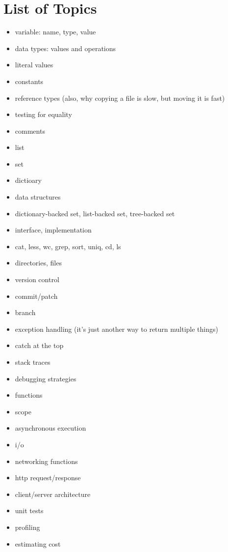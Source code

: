\section{List of Topics}
\begin{itemize}
  \item variable: name, type, value
  \item data types: values and operations
  \item literal values
  \item constants
\item reference types (also, why copying a file is slow, but moving it is fast)  \item testing for equality
  \item comments

  \item list
  \item set
  \item dictioary
  \item data structures
  \item dictionary-backed set, list-backed set, tree-backed set
  \item interface, implementation

  \item cat, less, wc, grep, sort, uniq, cd, ls
  \item directories, files

  \item version control
  \item commit/patch
  \item branch

  \item exception handling (it's just another way to return multiple things)
  \item catch at the top
  \item stack traces
  \item debugging strategies

  \item functions
  \item scope
  \item asynchronous execution
  \item i/o
  \item networking functions

  \item http request/response
  \item client/server architecture

  \item unit tests
  \item profiling
  \item estimating cost


\end{itemize}
